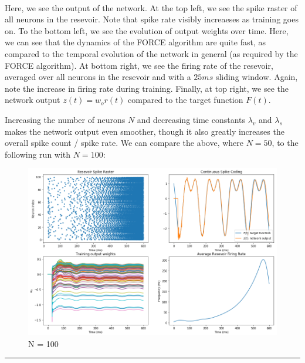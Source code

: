 \documentclass[11pt]{article}
\makeatletter
\def\maxwidth{\ifdim\Gin@nat@width>\linewidth\linewidth
    \else\Gin@nat@width\fi}
\let\Oldincludegraphics\includegraphics
\renewcommand{\includegraphics}[1]{\Oldincludegraphics[width=.8\maxwidth]{#1}}
\makeatother
\begin{document}
    \begin{center}
    \end{center}
    { \hspace*{\fill} \\}
    
    Here, we see the output of the network. At the top left, we see the
spike raster of all neurons in the resevoir. Note that spike rate
visibly increaeses as training goes on. To the bottom left, we see the
evolution of output weights over time. Here, we can see that the
dynamics of the FORCE algorithm are quite fast, as compared to the
temporal evolution of the network in general (as required by the FORCE
algorithm). At bottom right, we see the firing rate of the resevoir,
averaged over all neurons in the resevoir and with a \(25ms\) sliding
window. Again, note the increase in firing rate during training.
Finally, at top right, we see the network output \(z(t) = w_or(t)\)
compared to the target function \(F(t)\).

Increasing the number of neurons \(N\) and decreasing time constants
\(\lambda_v\) and \(\lambda_s\) makes the network output even smoother,
though it also greatly increases the overall spike count / spike rate.
We can compare the above, where \(N=50\), to the following run with
\(N=100\):

\begin{figure}
\centering
\includegraphics{N100.png}
\caption{N = 100}
\end{figure}

\begin{center}\rule{0.5\linewidth}{\linethickness}\end{center}
\end{document}
